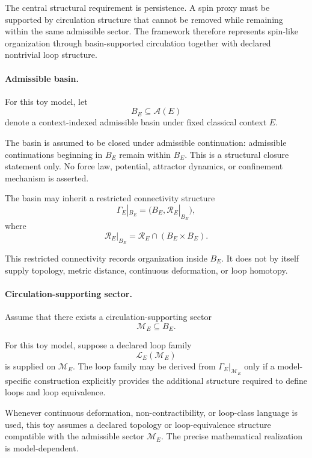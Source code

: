 \documentclass[aps,prx,onecolumn,11pt]{revtex4-2}
\theoremstyle{plain}
\theoremstyle{definition}
\theoremstyle{remark}
\begin{document}
The central structural requirement is persistence. A spin proxy must be
supported by circulation structure that cannot be removed while
remaining within the same admissible sector. The framework therefore
represents spin-like organization through basin-supported circulation
together with declared nontrivial loop structure.

\paragraph{Admissible basin.}

For this toy model, let
\[
B_E
\subseteq
\mathcal A(E)
\]
denote a context-indexed admissible basin under fixed classical context
\(E\).

The basin is assumed to be closed under admissible continuation:
admissible continuations beginning in \(B_E\) remain within \(B_E\).
This is a structural closure statement only. No force law, potential,
attractor dynamics, or confinement mechanism is asserted.

The basin may inherit a restricted connectivity structure
\[
\Gamma_E|_{B_E}
=
\bigl(
B_E,
\mathcal R_E|_{B_E}
\bigr),
\]
where
\[
\mathcal R_E|_{B_E}
=
\mathcal R_E
\cap
(B_E\times B_E).
\]

This restricted connectivity records organization inside \(B_E\). It
does not by itself supply topology, metric distance, continuous
deformation, or loop homotopy.

\paragraph{Circulation-supporting sector.}

Assume that there exists a circulation-supporting sector
\[
\mathcal M_E
\subseteq
B_E.
\]

For this toy model, suppose a declared loop family
\[
\mathcal L_E(\mathcal M_E)
\]
is supplied on \(\mathcal M_E\). The loop family may be derived from
\(\Gamma_E|_{\mathcal M_E}\) only if a model-specific construction
explicitly provides the additional structure required to define loops
and loop equivalence.

Whenever continuous deformation, non-contractibility, or loop-class
language is used, this toy assumes a declared topology or
loop-equivalence structure compatible with the admissible sector
\(\mathcal M_E\). The precise mathematical realization is
model-dependent.
\end{document}
